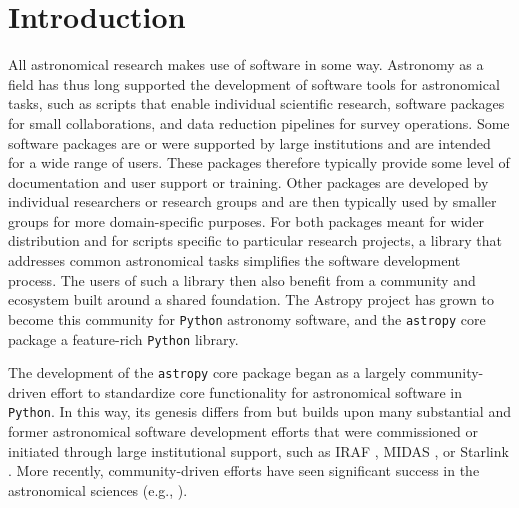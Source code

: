 \documentclass[modern]{aastex61}
\newcommand{\package}[1]{\texttt{#1}\xspace}
\newcommand{\python}{\package{Python}}
\newcommand{\astropy}{Astropy\xspace}
\newcommand{\astropypkg}{\package{astropy}}
\begin{document}
\section{Introduction} \label{sec:intro}
All astronomical research makes use of software in some way.
Astronomy as a field has thus long supported the development of software tools
for astronomical tasks, such as scripts that enable individual scientific
research, software packages for small collaborations, and data reduction
pipelines for survey operations.
Some software packages are or were supported by large institutions and are
intended for a wide range of users.
These packages therefore typically provide some level of documentation and user
support or training.
Other packages are developed by individual researchers or research groups and
are then typically used by smaller groups for more domain-specific purposes.
For both packages meant for wider distribution and for scripts specific to
particular research projects, a library that addresses common astronomical tasks
simplifies the software development process.
The users of such a library then also benefit from a community and ecosystem
built around a shared foundation.
The \astropy project has grown to become this community for \python astronomy
software, and the \astropypkg core package a feature-rich \python library.

The development of the \astropypkg core package began as a largely
community-driven effort to standardize core functionality for astronomical
software in \python.
In this way, its genesis differs from but builds upon many substantial and
former astronomical software development efforts that were commissioned or
initiated through large institutional support, such as IRAF \citep[developed
at NOAO;][]{IRAF}, MIDAS \citep[developed at ESO;][]{MIDAS}, or Starlink
\citep[originally developed by a consortium of UK institutions and now
maintained by the East Asian Observatory;][]{starlink1982,starlink2013}.
More recently, community-driven efforts have seen significant success in the astronomical sciences (e.g., \citealt{yt}).
\end{document}
